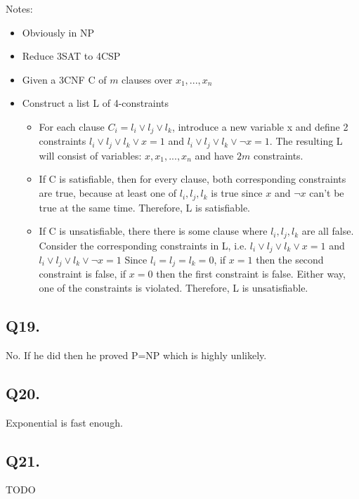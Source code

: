 \documentclass[letterpaper]{article}
\begin{document}
Notes:
\begin{itemize}
  \item Obviously in NP
  \item Reduce 3SAT to 4CSP
  \item Given a 3CNF C of $m$ clauses over $x_1,...,x_n$
  \item Construct a list L of 4-constraints
        \begin{itemize}
          \item For each clause $C_i = l_i \vee l_j \vee l_k$, introduce a new
                variable x and define 2 constraints
                $l_i \vee l_j \vee l_k \vee x = 1$ and $l_i \vee l_j \vee l_k \vee \neg x = 1$.
                The resulting L will consist of variables: $x, x_1,...,x_n$ and have $2m$ constraints.
          \item If C is satisfiable, then for every clause, both corresponding
                constraints are true, because at least one of $l_i, l_j, l_k$ is true since $x$
                and $\neg x$ can't be true at the same time. Therefore, L is satisfiable.
          \item If C is unsatisfiable, there there is some clause where $l_i, l_j, l_k$
                are all false. Consider the corresponding constraints in L, i.e.
                $l_i \vee l_j \vee l_k \vee x = 1$ and $l_i \vee l_j \vee l_k \vee \neg x = 1$
                Since $l_i = l_j = l_k = 0$, if $x=1$ then the second constraint is false,
                if $x=0$ then the first constraint is false. Either way, one of the constraints
                is violated. Therefore, L is unsatisfiable.
        \end{itemize}
\end{itemize}

\subsection*{Q19.}

No. If he did then he proved P=NP which is highly unlikely.

\subsection*{Q20.}

Exponential is fast enough.

\subsection*{Q21.}
TODO
\end{document}
